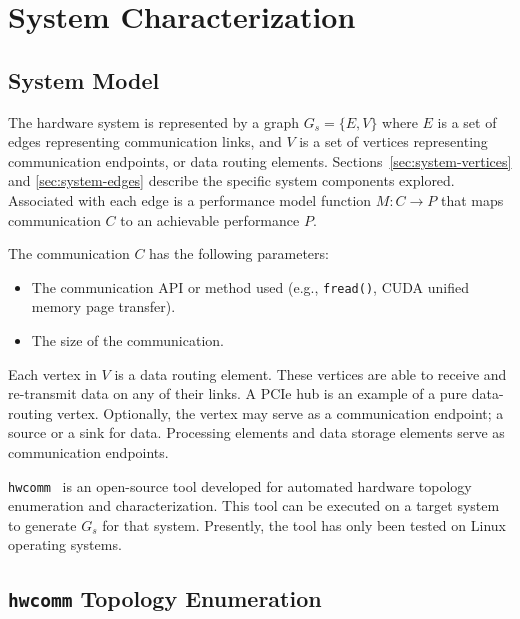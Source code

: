 \chapter{System Characterization}
\label{ch:sys-char}

\section{System Model}
\label{sec:system-model}

The hardware system is represented by a graph $G_s = \{E,V\}$ where $E$ is a set of edges representing communication links, and $V$ is a set of vertices representing communication endpoints, or data routing elements.
Sections~\ref{sec:system-vertices} and \ref{sec:system-edges} describe the specific system components explored.
Associated with each edge is a performance model function $M: C \rightarrow P$ that maps communication $C$ to an achievable performance $P$.

The communication $C$ has the following parameters:
\begin{itemize}
    \item The communication API or method used (e.g., \texttt{fread()}, CUDA unified memory page transfer).
    \item The size of the communication.
\end{itemize}


Each vertex in $V$ is a data routing element.
These vertices are able to receive and re-transmit data on any of their links.
A PCIe hub  is an example of a pure data-routing vertex.
Optionally, the vertex may serve as a communication endpoint; a source or a sink for data.
Processing elements and data storage elements serve as communication endpoints.


\texttt{hwcomm}~\cite{pearson2018hwcomm} is an open-source tool developed for automated hardware topology enumeration and characterization.
This tool can be executed on a target system to generate $G_s$ for that system.
Presently, the tool has only been tested on Linux operating systems.



%
%
\section{\texttt{hwcomm} Topology Enumeration}
\label{sec:topology-exploration}

